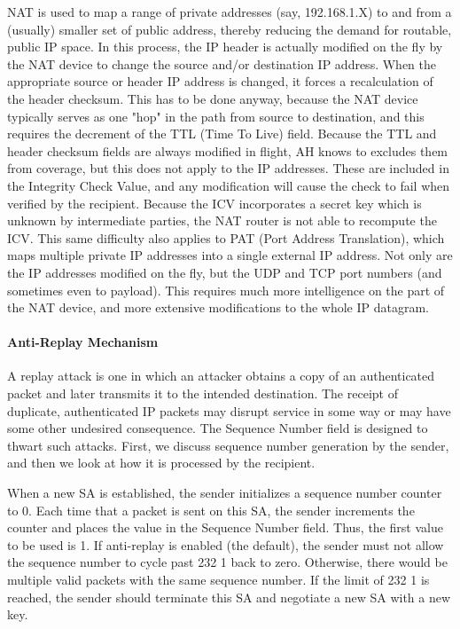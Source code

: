 \documentclass[12pt]{article}
\begin{document}
NAT is used to map a range of private addresses (say, 192.168.1.X) to and from a (usually) smaller set of public address, thereby reducing the demand for routable, public IP space. In this process, the IP header is actually modified on the fly by the NAT device to change the source and/or destination IP address.
When the appropriate source or header IP address is changed, it forces a recalculation of the header checksum. This has to be done anyway, because the NAT device typically serves as one "hop" in the path from source to destination, and this requires the decrement of the TTL (Time To Live) field.
Because the TTL and header checksum fields are always modified in flight, AH knows to excludes them from coverage, but this does not apply to the IP addresses. These are included in the Integrity Check Value, and any modification will cause the check to fail when verified by the recipient. Because the ICV incorporates a secret key which is unknown by intermediate parties, the NAT router is not able to recompute the ICV.
This same difficulty also applies to PAT (Port Address Translation), which maps multiple private IP addresses into a single external IP address. Not only are the IP addresses modified on the fly, but the UDP and TCP port numbers (and sometimes even to payload). This requires much more intelligence on the part of the NAT device, and more extensive modifications to the whole IP datagram.


\paragraph*{Anti-Replay Mechanism}
A replay attack is one in which an attacker obtains a copy of an authenticated packet and later transmits it to the intended destination. The receipt of duplicate, authenticated IP packets may disrupt service in some way or may have some other undesired consequence. The Sequence Number field is designed to thwart such attacks. First, we discuss sequence number generation by the sender, and then we look at how it is processed by the recipient.


When a new SA is established, the sender initializes a sequence number counter to 0. Each time that a packet is sent on this SA, the sender increments the counter and places the value in the Sequence Number field. Thus, the first value to be used is 1. If anti-replay is enabled (the default), the sender must not allow the sequence number to cycle past 232 1 back to zero. Otherwise, there would be multiple valid packets with the same sequence number. If the limit of 232 1 is reached, the sender should terminate this SA and negotiate a new SA with a new key.
\end{document}
